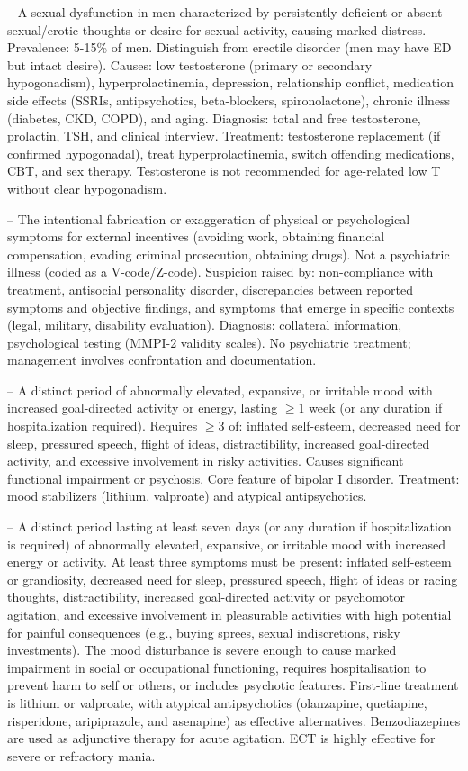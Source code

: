 -- A sexual dysfunction in men characterized by persistently deficient or absent sexual/erotic thoughts or desire for sexual activity, causing marked distress. Prevalence: 5-15\% of men. Distinguish from erectile disorder (men may have ED but intact desire). Causes: low testosterone (primary or secondary hypogonadism), hyperprolactinemia, depression, relationship conflict, medication side effects (SSRIs, antipsychotics, beta-blockers, spironolactone), chronic illness (diabetes, CKD, COPD), and aging. Diagnosis: total and free testosterone, prolactin, TSH, and clinical interview. Treatment: testosterone replacement (if confirmed hypogonadal), treat hyperprolactinemia, switch offending medications, CBT, and sex therapy. Testosterone is not recommended for age-related low T without clear hypogonadism.

-- The intentional fabrication or exaggeration of physical or psychological symptoms for external incentives (avoiding work, obtaining financial compensation, evading criminal prosecution, obtaining drugs). Not a psychiatric illness (coded as a V-code/Z-code). Suspicion raised by: non-compliance with treatment, antisocial personality disorder, discrepancies between reported symptoms and objective findings, and symptoms that emerge in specific contexts (legal, military, disability evaluation). Diagnosis: collateral information, psychological testing (MMPI-2 validity scales). No psychiatric treatment; management involves confrontation and documentation.

-- A distinct period of abnormally elevated, expansive, or irritable mood with increased goal-directed activity or energy, lasting \(\ge\)1 week (or any duration if hospitalization required). Requires \(\ge\)3 of: inflated self-esteem, decreased need for sleep, pressured speech, flight of ideas, distractibility, increased goal-directed activity, and excessive involvement in risky activities. Causes significant functional impairment or psychosis. Core feature of bipolar I disorder. Treatment: mood stabilizers (lithium, valproate) and atypical antipsychotics.

-- A distinct period lasting at least seven days (or any duration if hospitalization is required) of abnormally elevated, expansive, or irritable mood with increased energy or activity. At least three symptoms must be present: inflated self-esteem or grandiosity, decreased need for sleep, pressured speech, flight of ideas or racing thoughts, distractibility, increased goal-directed activity or psychomotor agitation, and excessive involvement in pleasurable activities with high potential for painful consequences (e.g., buying sprees, sexual indiscretions, risky investments). The mood disturbance is severe enough to cause marked impairment in social or occupational functioning, requires hospitalisation to prevent harm to self or others, or includes psychotic features. First-line treatment is lithium or valproate, with atypical antipsychotics (olanzapine, quetiapine, risperidone, aripiprazole, and asenapine) as effective alternatives. Benzodiazepines are used as adjunctive therapy for acute agitation. ECT is highly effective for severe or refractory mania.

